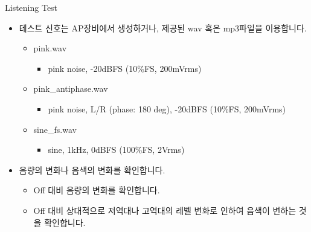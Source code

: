 \documentclass{beamer}
\begin{document}
	\begin{frame}[t]{Listening Test}
		\begin{itemize}
			\item 테스트 신호는 AP장비에서 생성하거나, 제공된 wav 혹은 mp3파일을 이용합니다.
			\begin{itemize}
				\item pink.wav
				\begin{itemize}
					\item pink noise, -20dBFS (10\%FS, 200mVrms)
				\end{itemize}
				\item pink\_antiphase.wav
				\begin{itemize}
					\item pink noise, L/R (phase: 180 deg), -20dBFS (10\%FS, 200mVrms)
				\end{itemize}
				\item sine\_fs.wav
				\begin{itemize}
					\item sine, 1kHz, 0dBFS (100\%FS, 2Vrms)
				\end{itemize}
			\end{itemize}
			\item 음량의 변화나 음색의 변화를 확인합니다.
			\begin{itemize}
				\item Off 대비 음량의 변화를 확인합니다.
				\item Off 대비 상대적으로 저역대나 고역대의 레벨 변화로 인하여 음색이 변하는 것을 확인합니다.
			\end{itemize}
		\end{itemize}
		
	\end{frame}
	
\end{document}
